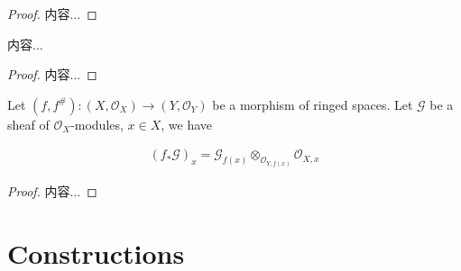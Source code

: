 \documentclass[Total.tex]{subfiles}
\begin{document}
				\begin{proof}
					内容...
				\end{proof}
				
				\begin{lemma}
					内容...
				\end{lemma}
				
				\begin{proof}
					内容...
				\end{proof}
				
				\begin{lemma}
					Let $(f,f^\#):(X,\mathcal{O}_X)\rightarrow (Y,\mathcal{O}_Y)$ be a morphism of ringed spaces. Let $\mathcal{G}$ be a sheaf of $\mathcal{O}_X$-modules, $x\in X$, we have
					
					\begin{gather*}
						(f_*\mathcal{G})_x=\mathcal{G}_{f(x)}\otimes_{\mathcal{O}_{Y,f(x)}} \mathcal{O}_{X,x}
					\end{gather*}
				\end{lemma}
				
				\begin{proof}
					内容...
				\end{proof}
		\section{Constructions}
\end{document}

